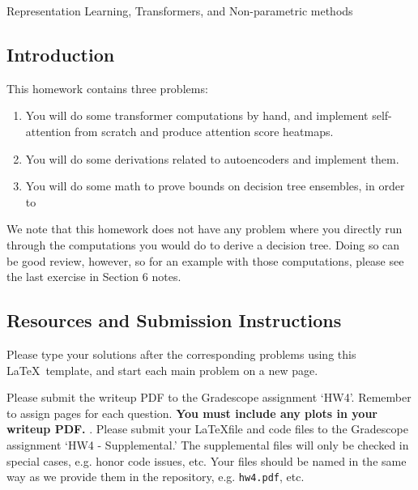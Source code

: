 \documentclass[submit]{harvardml}
\begin{document}
\begin{center}
{\Large Representation Learning, Transformers, and Non-parametric methods}\\
\end{center}

\subsection*{Introduction}

This homework contains three problems:
\begin{enumerate}
    \item You will do some transformer computations by hand, and implement self-attention from scratch and produce attention score heatmaps.
    \item You will do some derivations related to autoencoders and implement them.
    \item You will do some math to prove bounds on decision tree ensembles, in order to 
\end{enumerate}

We note that this homework does not have any problem where you directly run through the computations you would do to derive a decision tree. Doing so can be good review, however, so for an example with those computations, please see the last exercise in Section 6 notes.

\subsection*{Resources and Submission Instructions}

Please type your solutions after the corresponding problems using this \LaTeX\ template, and start each main problem on a new page.

Please submit the writeup PDF to the Gradescope assignment `HW4'. Remember to assign pages for each question.  \textbf{You must include any plots in your writeup PDF. }. Please submit your \LaTeX file and code files to the Gradescope assignment `HW4 - Supplemental.' The supplemental files will only be checked in special cases, e.g. honor code issues, etc. Your files should be named in the same way as we provide them in the repository, e.g. \texttt{hw4.pdf}, etc.




\newpage

\end{document}
